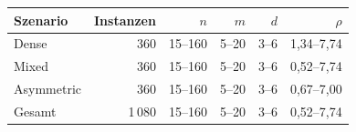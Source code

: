 \begin{tabular}{lrrrrr}
\toprule
Szenario & Instanzen & $n$ & $m$ & $d$ & $\rho$ \\
\midrule
Dense & 360 & 15--160 & 5--20 & 3--6 & 1{,}34--7{,}74 \\
Mixed & 360 & 15--160 & 5--20 & 3--6 & 0{,}52--7{,}74 \\
Asymmetric & 360 & 15--160 & 5--20 & 3--6 & 0{,}67--7{,}00 \\
\midrule
Gesamt & 1\,080 & 15--160 & 5--20 & 3--6 & 0{,}52--7{,}74 \\
\bottomrule
\end{tabular}
